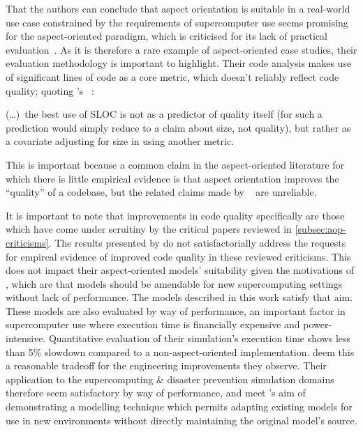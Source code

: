 That the authors can conclude that aspect orientation is suitable in a
real-world use case constrained by the requirements of supercomputer use seems
promising for the aspect-oriented paradigm, which is criticised for its lack of
practical
evaluation~\cite{Constantinides04aopconsidered,steimann06paradoxical,przybylek2010wrong}.
As it is therefore a rare example of aspect-oriented case studies, their
evaluation methodology is important to highlight. Their code analysis makes use
of significant lines of code as a core metric, which doesn't reliably reflect
code quality; quoting \citeauthor{rosenberg1997some}'s ~\cite{rosenberg1997some}:
\begin{displayquote}
    (\ldots{})~the best use of SLOC is not as a predictor of quality
itself (for such a prediction would simply reduce to a claim about size, not
quality), but rather as a covariate adjusting for size in using another
metric.
\end{displayquote}
This is important because a common claim in the aspect-oriented
literature for which there is little empirical evidence is that aspect
orientation improves the ``quality'' of a codebase, but the related claims made
by \citeauthor{ionescu2009aspect}~\cite{ionescu2009aspect} are unreliable.

It is important to note that improvements in code quality specifically are those
which have come under scruitiny by the critical papers reviewed in
\cref{subsec:aop-criticisms}. The results presented by
\citeauthor{ionescu2009aspect} do not satisfactorially address the requests for
empircal evidence of improved code quality in these reviewed criticisms. This
does not impact their aspect-oriented models' suitability given the motivations
of \citeauthor{ionescu2009aspect}, which are that models should be amendable for
new supercomputing settings without lack of performance. The models described in
this work satisfy that aim. These models are also evaluated by way of
performance, an important factor in supercomputer use where execution time is
financially expensive and power-intensive. Quantitative evaluation of their
simulation's execution time shows less than 5\% slowdown compared to a
non-aspect-oriented implementation. \citeauthor{ionescu2009aspect} deem this a
reasonable tradeoff for the engineering improvements they observe. Their
application to the supercomputing \& disaster prevention simulation domains
therefore seem satisfactory by way of performance, and meet
\citeauthor{ionescu2009aspect}'s aim of demonstrating a modelling technique
which permits adapting existing models for use in new environments without
directly maintaining the original model's source.


